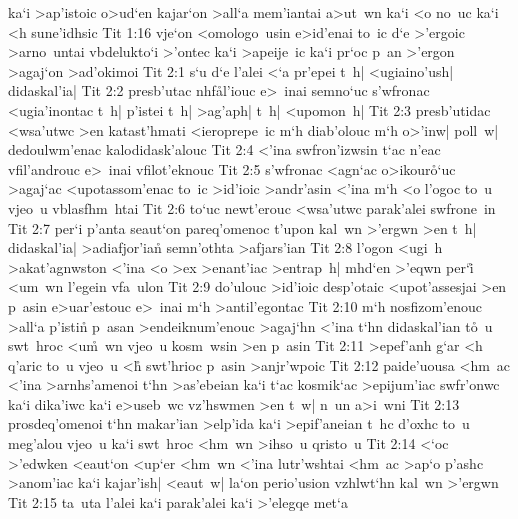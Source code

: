 ka`i
>ap'istoic
o>ud`en
kajar`on
>all`a
mem'iantai
a>ut~wn
ka`i
<o
no~uc
ka`i
<h
sune'idhsic\bibvsend
\vs Tit 1:16
vje`on
<omologo~usin
e>id'enai
to~ic
d`e
>'ergoic
>arno~untai
vbdelukto`i
>'ontec
ka`i
>apeije~ic
ka`i
pr`oc
p~an
>'ergon
>agaj`on
>ad'okimoi\bibvsend
\vs Tit 2:1
s`u
d`e
l'alei
<`a
pr'epei
t~h|
<ugiaino'ush|
didaskal'ia|\bibvsend
\vs Tit 2:2
presb'utac
nh\-f\r{a}\-l'i\-ouc
e>~inai
semno`uc
s'wfronac
<ugia'inontac
t~h|
p'istei
t~h|
>ag'aph|
t~h|
<upomon~h|\bibvsend
\vs Tit 2:3
presb'utidac
<wsa'utwc
>en
katast'hmati
<ieroprepe~ic
m`h
diab'olouc
m`h
o>'inw|
poll~w|
dedoulwm'enac
kalodidask'alouc\bibvsend
\vs Tit 2:4
<'ina
swfron'izwsin
t`ac
n'e\-ac
vfil'androuc
e>~inai
vfilot'eknouc\bibvsend
\vs Tit 2:5
s'wfronac
<agn`ac
o>i\-kou\-r\r{o}`uc
>agaj`ac
<upotassom'enac
to~ic
>id'ioic
>andr'asin
<'ina
m`h
<o
l'ogoc
to~u
vjeo~u
vblasfhm~htai\bibvsend
\vs Tit 2:6
to`uc
newt'erouc
<wsa'utwc
parak'alei
swfrone~in\bibvsend
\vs Tit 2:7
per`i
p'anta
seaut`on
pareq'omenoc
t'upon
kal~wn
>'ergwn
>en
t~h|
didaskal'ia|
>adiafjor'ian\r{}
semn'othta
>afjars'ian\bibvsend
\vs Tit 2:8
l'ogon
<ugi~h
>akat'agnwston
<'ina
<o
>ex
>enant'iac
>entrap~h|
mhd`en
>'eqwn
per`i\r{}
<um~wn
l'egein
vfa~ulon\bibvsend
\vs Tit 2:9
do'ulouc
>id'ioic
desp'otaic
<upot'assesjai
>en
p~asin
e>uar'estouc
e>~inai
m`h
>antil'egontac\bibvsend
\vs Tit 2:10
m`h
nosfizom'enouc
>all`a
p'istin\r{}
p~asan
>endeiknum'enouc
>agaj`hn
<'ina
t`hn
didaskal'ian
t\r{o}~u
swt~hroc
<u\r{m}~wn
vjeo~u
kosm~wsin
>en
p~asin\bibvsend
\vs Tit 2:11
>epef'anh
g`ar
<h
q'aric
to~u
vjeo~u
<h\r{}
swt'hrioc
p~asin
>anjr'wpoic\bibvsend
\vs Tit 2:12
paide'uousa
<hm~ac
<'ina
>arnhs'amenoi
t`hn
>as'ebeian
ka`i
t`ac
kosmik`ac
>epijum'iac
swfr'onwc
ka`i
dika'iwc
ka`i
e>useb~wc
vz'hswmen
>en
t~w|
n~un
a>i~wni\bibvsend
\vs Tit 2:13
prosdeq'omenoi
t`hn
makar'ian
>elp'ida
ka`i
>epif'aneian
t~hc
d'oxhc
to~u
meg'alou
vjeo~u
ka`i
swt~hroc
<hm~wn
>ihso~u
qristo~u\bibvsend
\vs Tit 2:14
<`oc
>'edwken
<eaut`on
<up`er
<hm~wn
<'ina
lutr'wshtai
<hm~ac
>ap`o
p'ashc
>anom'iac
ka`i
kajar'ish|
<eaut~w|
la`on
perio'usion
vzhlwt`hn
kal~wn
>'ergwn\bibvsend
\vs Tit 2:15
ta~uta
l'alei
ka`i
parak'alei
ka`i
>'elegqe
met`a
